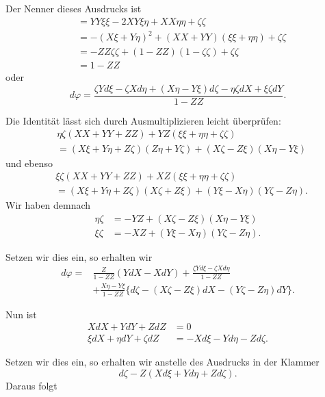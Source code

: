 %
Der Nenner dieses Ausdrucks ist
\[
\begin{aligned}
&=YY\xi\xi-2XY\xi\eta+XX\eta\eta+\zeta\zeta\\
&=-(X\xi+Y\eta)^{2}+(XX+YY)(\xi\xi+\eta\eta)+\zeta\zeta\\
&=-ZZ\zeta\zeta+(1-ZZ)(1-\zeta\zeta)+\zeta\zeta\\
&=1-ZZ
\end{aligned}
\]
oder
\[
d\varphi=\frac{\zeta Yd\xi-\zeta Xd\eta+(X\eta-Y\xi)d\zeta-\eta\zeta dX+\xi\zeta dY}{1-ZZ}.
\]

Die Identität lässt sich durch Ausmultiplizieren leicht überprüfen:
\[
\begin{aligned}
&\eta\zeta(XX+YY+ZZ)+YZ(\xi\xi+\eta\eta+\zeta\zeta)\\
&=(X\xi+Y\eta+Z\zeta)(Z\eta+Y\zeta)+(X\zeta-Z\xi)(X\eta-Y\xi)
\end{aligned}
\]
und ebenso
\[
\begin{aligned}
&\xi\zeta(XX+YY+ZZ)+XZ(\xi\xi+\eta\eta+\zeta\zeta)\\
&=(X\xi+Y\eta+Z\zeta)(X\zeta+Z\xi)+(Y\xi-X\eta)(Y\zeta-Z\eta).
\end{aligned}
\]
Wir haben demnach
\[
\begin{aligned}
\eta\zeta&=-YZ+(X\zeta-Z\xi)(X\eta-Y\xi)\\
\xi\zeta&=-XZ+(Y\xi-X\eta)(Y\zeta-Z\eta).
\end{aligned}
\]

Setzen wir dies ein, so erhalten wir
\[
\begin{aligned}
d\varphi={}&\frac{Z}{1-ZZ}(YdX-XdY)+\frac{\zeta Yd\xi-\zeta Xd\eta}{1-ZZ}\\
&+\frac{X\eta-Y\xi}{1-ZZ}\{d\zeta-(X\zeta-Z\xi)dX-(Y\zeta-Z\eta)dY\}.
\end{aligned}
\]

Nun ist
\[
\begin{aligned}
XdX+YdY+ZdZ&=0\\
\xi dX+\eta dY+\zeta dZ&=-Xd\xi-Yd\eta-Zd\zeta.
\end{aligned}
\]

Setzen wir dies ein, so erhalten wir anstelle des Ausdrucks in der Klammer
\[
d\zeta-Z(Xd\xi+Yd\eta+Zd\zeta).
\]
Daraus folgt

